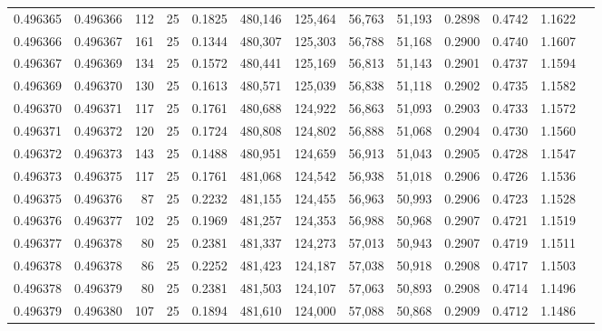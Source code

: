 \begin{tabular}{rrrrrrrrrrrrr}
0.496365 & 0.496366 &   112 &  25 &                                     0.1825 & 480,146 & 125,464 &  56,763 &  51,193 & 0.2898 & 0.4742 & 1.1622 \\
0.496366 & 0.496367 &   161 &  25 &                                     0.1344 & 480,307 & 125,303 &  56,788 &  51,168 & 0.2900 & 0.4740 & 1.1607 \\
0.496367 & 0.496369 &   134 &  25 &                                     0.1572 & 480,441 & 125,169 &  56,813 &  51,143 & 0.2901 & 0.4737 & 1.1594 \\
0.496369 & 0.496370 &   130 &  25 &                                     0.1613 & 480,571 & 125,039 &  56,838 &  51,118 & 0.2902 & 0.4735 & 1.1582 \\
0.496370 & 0.496371 &   117 &  25 &                                     0.1761 & 480,688 & 124,922 &  56,863 &  51,093 & 0.2903 & 0.4733 & 1.1572 \\
0.496371 & 0.496372 &   120 &  25 &                                     0.1724 & 480,808 & 124,802 &  56,888 &  51,068 & 0.2904 & 0.4730 & 1.1560 \\
0.496372 & 0.496373 &   143 &  25 &                                     0.1488 & 480,951 & 124,659 &  56,913 &  51,043 & 0.2905 & 0.4728 & 1.1547 \\
0.496373 & 0.496375 &   117 &  25 &                                     0.1761 & 481,068 & 124,542 &  56,938 &  51,018 & 0.2906 & 0.4726 & 1.1536 \\
0.496375 & 0.496376 &    87 &  25 &                                     0.2232 & 481,155 & 124,455 &  56,963 &  50,993 & 0.2906 & 0.4723 & 1.1528 \\
0.496376 & 0.496377 &   102 &  25 &                                     0.1969 & 481,257 & 124,353 &  56,988 &  50,968 & 0.2907 & 0.4721 & 1.1519 \\
0.496377 & 0.496378 &    80 &  25 &                                     0.2381 & 481,337 & 124,273 &  57,013 &  50,943 & 0.2907 & 0.4719 & 1.1511 \\
0.496378 & 0.496378 &    86 &  25 &                                     0.2252 & 481,423 & 124,187 &  57,038 &  50,918 & 0.2908 & 0.4717 & 1.1503 \\
0.496378 & 0.496379 &    80 &  25 &                                     0.2381 & 481,503 & 124,107 &  57,063 &  50,893 & 0.2908 & 0.4714 & 1.1496 \\
0.496379 & 0.496380 &   107 &  25 &                                     0.1894 & 481,610 & 124,000 &  57,088 &  50,868 & 0.2909 & 0.4712 & 1.1486 \\

\end{tabular}
